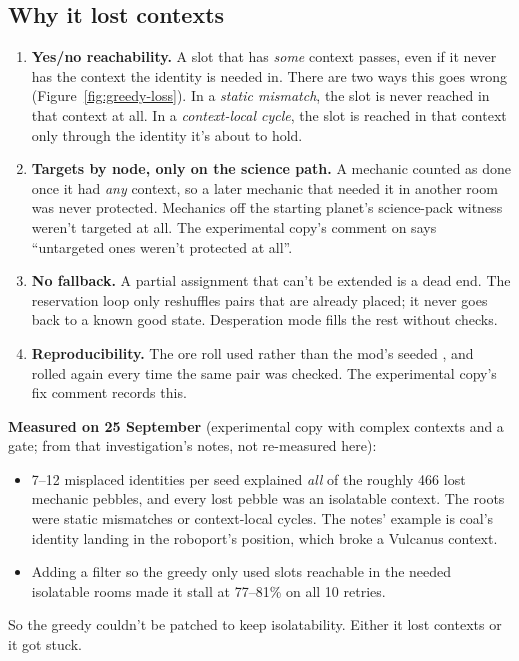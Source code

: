 \subsection{Why it lost contexts}
\label{sec:greedy-losses}

\begin{enumerate}[leftmargin=*]
  \item \textbf{Yes/no reachability.} A slot that has \emph{some} context passes, even if it never has the context the identity is needed in. There are two ways this goes wrong (Figure~\ref{fig:greedy-loss}). In a \emph{static mismatch}, the slot is never reached in that context at all. In a \emph{context-local cycle}, the slot is reached in that context only through the identity it's about to hold.
  \item \textbf{Targets by node, only on the science path.} A mechanic counted as done once it had \emph{any} context, so a later mechanic that needed it in another room was never protected. Mechanics off the starting planet's science-pack witness weren't targeted at all. The experimental copy's comment on  says ``untargeted ones weren't protected at all''.
  \item \textbf{No fallback.} A partial assignment that can't be extended is a dead end. The reservation loop only reshuffles pairs that are already placed; it never goes back to a known good state. Desperation mode fills the rest without checks.
  \item \textbf{Reproducibility.} The ore roll used  rather than the mod's seeded , and rolled again every time the same pair was checked. The experimental copy's fix comment records this.
\end{enumerate}

\begin{factbox}
\textbf{Measured on 25 September} (experimental copy with complex contexts and a gate; from that investigation's notes, not re-measured here):
\begin{itemize}
  \item 7--12 misplaced identities per seed explained \emph{all} of the roughly 466 lost mechanic pebbles, and every lost pebble was an isolatable context. The roots were static mismatches or context-local cycles. The notes' example is coal's identity landing in the roboport's position, which broke a Vulcanus context.
  \item Adding a filter so the greedy only used slots reachable in the needed isolatable rooms made it stall at 77--81\% on all 10 retries.
\end{itemize}
So the greedy couldn't be patched to keep isolatability. Either it lost contexts or it got stuck.
\end{factbox}

